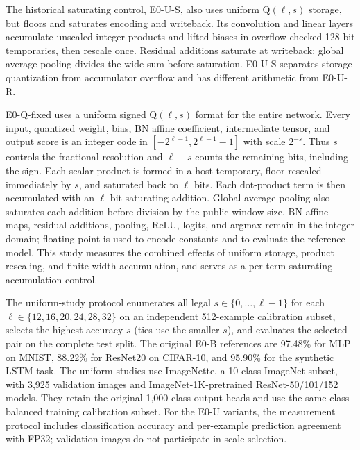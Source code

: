 \documentclass[journal]{IEEEtran}
\theoremstyle{definition}
\theoremstyle{plain}
\begin{document}
The historical saturating control, E0-U-S, also uses uniform
Q$(\ell,s)$ storage, but floors and saturates encoding and writeback.
Its convolution and linear layers accumulate unscaled integer products
and lifted biases in overflow-checked 128-bit temporaries, then rescale
once. Residual additions saturate at writeback; global average pooling
divides the wide sum before saturation. E0-U-S separates storage
quantization from accumulator overflow and has different arithmetic from
E0-U-R.

E0-Q-fixed uses a uniform signed Q$(\ell,s)$ format for the entire network.
Every input, quantized weight, bias, BN affine coefficient, intermediate
tensor, and output score is an integer code in
$[-2^{\ell-1},2^{\ell-1}-1]$ with scale $2^{-s}$. Thus $s$ controls the
fractional resolution and $\ell-s$ counts the remaining bits, including
the sign. Each scalar product is formed in a host temporary, floor-rescaled
immediately by $s$, and saturated back to $\ell$ bits. Each dot-product term
is then accumulated with an $\ell$-bit saturating addition. Global average
pooling also saturates each addition before division by the public window
size. BN affine maps, residual additions, pooling, ReLU, logits, and argmax
remain in the integer domain; floating point is used to encode constants
and to evaluate the reference model. This study measures the combined
effects of uniform storage, product rescaling, and finite-width accumulation,
and serves as a per-term saturating-accumulation control.

The uniform-study protocol enumerates all legal
$s\in\{0,\ldots,\ell-1\}$ for each $\ell\in\{12,16,20,24,28,32\}$
on an independent 512-example calibration subset,
selects the highest-accuracy $s$ (ties use the smaller $s$), and evaluates the
selected pair on the complete test split. The original E0-B references are
97.48\% for MLP on MNIST, 88.22\% for ResNet20 on CIFAR-10, and 95.90\% for
the synthetic LSTM task. The uniform studies use ImageNette, a 10-class
ImageNet subset, with 3,925 validation images and ImageNet-1K-pretrained
ResNet-50/101/152 models. They retain the original 1,000-class output heads
and use the same class-balanced training calibration subset. For the E0-U
variants, the measurement protocol includes classification accuracy and
per-example prediction agreement with FP32; validation images do not
participate in scale selection.
\end{document}

